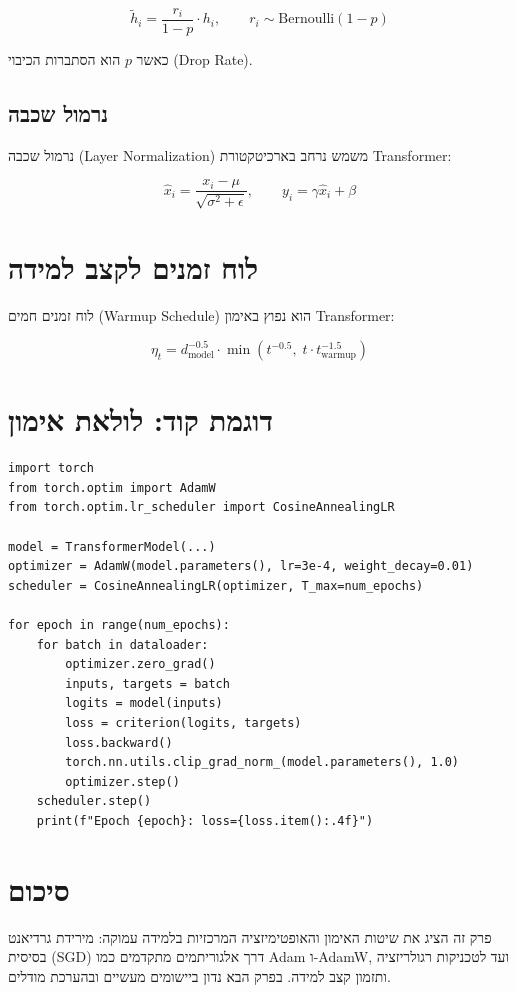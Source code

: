 \begin{equation}
    \tilde{h}_i = \frac{r_i}{1 - p} \cdot h_i, \qquad r_i \sim \text{Bernoulli}(1 - p)
\end{equation}

כאשר \(p\) הוא הסתברות הכיבוי (\textenglish{Drop Rate}).

\subsection{נרמול שכבה}

נרמול שכבה (\textenglish{Layer Normalization}) משמש נרחב בארכיטקטורת
\textenglish{Transformer}:

\begin{equation}
    \hat{x}_i = \frac{x_i - \mu}{\sqrt{\sigma^2 + \epsilon}}, \qquad
    y_i = \gamma \hat{x}_i + \beta
\end{equation}

\section{לוח זמנים לקצב למידה}

לוח זמנים חמים (\textenglish{Warmup Schedule}) הוא נפוץ באימון
\textenglish{Transformer}:

\begin{equation}
    \eta_t = d_{\text{model}}^{-0.5} \cdot
    \min\!\left( t^{-0.5},\; t \cdot t_{\text{warmup}}^{-1.5} \right)
\end{equation}

\section{דוגמת קוד: לולאת אימון}

\begin{LTR}
\begin{verbatim}
import torch
from torch.optim import AdamW
from torch.optim.lr_scheduler import CosineAnnealingLR

model = TransformerModel(...)
optimizer = AdamW(model.parameters(), lr=3e-4, weight_decay=0.01)
scheduler = CosineAnnealingLR(optimizer, T_max=num_epochs)

for epoch in range(num_epochs):
    for batch in dataloader:
        optimizer.zero_grad()
        inputs, targets = batch
        logits = model(inputs)
        loss = criterion(logits, targets)
        loss.backward()
        torch.nn.utils.clip_grad_norm_(model.parameters(), 1.0)
        optimizer.step()
    scheduler.step()
    print(f"Epoch {epoch}: loss={loss.item():.4f}")
\end{verbatim}
\end{LTR}

\section{סיכום}

פרק זה הציג את שיטות האימון והאופטימיזציה המרכזיות בלמידה עמוקה: מירידת
גרדיאנט בסיסית (\textenglish{SGD}) דרך אלגוריתמים מתקדמים כמו \textenglish{Adam}
ו-\textenglish{AdamW}, ועד לטכניקות רגולריזציה ותזמון קצב למידה. בפרק הבא נדון
ביישומים מעשיים ובהערכת מודלים.
